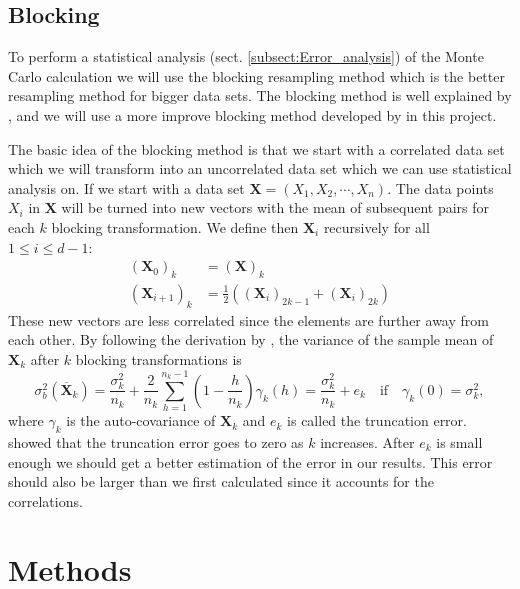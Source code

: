 \documentclass[12pt,a4paper,english]{article}
\begin{document}
\subsection{Blocking}
\label{subsect:Blocking}
To perform a statistical analysis (sect. \ref{subsect:Error_analysis}) of the Monte Carlo calculation we will use the blocking resampling method which is the better resampling method for bigger data sets. The blocking method is well explained by \citet{flyvbjerg1989error}, and we will use a more improve blocking method developed by \citet{jonsson2018standard} in this project. 

The basic idea of the blocking method is that we start with a correlated data set which we will transform into an uncorrelated data set which we can use statistical analysis on. If we start with a data set $\textbf{X}=(X_1,X_2,\cdots,X_n)$. The data points $X_i$ in $\textbf{X}$ will be turned into new vectors with the mean of subsequent pairs for each $k$ blocking transformation. We define then $\textbf{X}_i$ recursively for all $1\leq i \leq d-1$:
\begin{align*}
(\textbf{X}_0)_k&=(\textbf{X})_k\\
(\textbf{X}_{i+1})_k&=\frac{1}{2}\left((\textbf{X}_i)_{2k-1}+(\textbf{X}_i)_{2k}\right)
\end{align*}
These new vectors are less correlated since the elements are further away from each other. By following the derivation by \citet{jonsson2018standard}, the variance of the sample mean of $\textbf{X}_k$ after $k$ blocking transformations is
\begin{equation}
\label{eq:blocking_var}
\sigma^2_b(\overline{\textbf{X}}_k)=\frac{\sigma_k^2}{n_k}+\frac{2}{n_k}\sum_{h=1}^{n_k-1}\left(1-\frac{h}{n_k}\right)\gamma_k(h)=\frac{\sigma_k^2}{n_k}+e_k\quad \text{if}\quad \gamma_k(0)=\sigma_k^2,
\end{equation}
where $\gamma_k$ is the auto-covariance of $\textbf{X}_k$ and $e_k$ is called the truncation error. \citet{flyvbjerg1989error} showed that the truncation error goes to zero as $k$ increases. After $e_k$ is small enough we should get a better estimation of the error in our results. This error should also be larger than we first calculated since it accounts for the correlations.

\section{Methods}
\label{sect:Methods}
\end{document}
